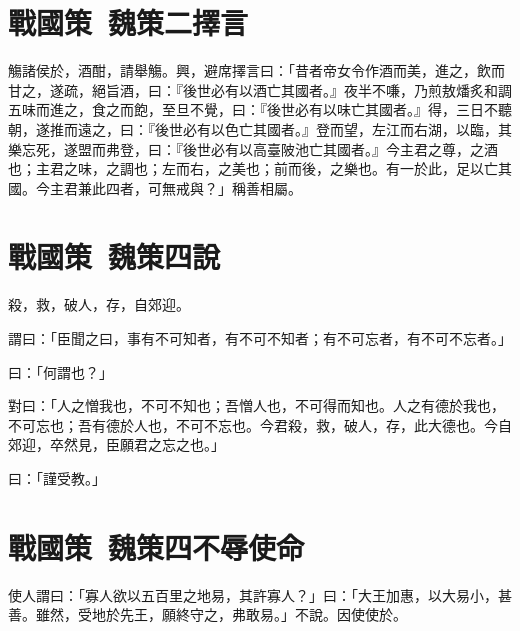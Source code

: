 \section[魯共公擇言\quad{\small 戰國策\ 魏策二}]{{\normalsize 戰國策\ 魏策二}\quad {}擇言}
觴諸侯於，酒酣，請舉觴。興，避席擇言曰：「昔者帝女令作酒而美，進之，飲而甘之，遂疏，絕旨酒，曰：『後世必有以酒亡其國者。』夜半不嗛，乃煎敖燔炙和調五味而進之，食之而飽，至旦不覺，曰：『後世必有以味亡其國者。』得，三日不聽朝，遂推而遠之，曰：『後世必有以色亡其國者。』登而望，左江而右湖，以臨，其樂忘死，遂盟而弗登，曰：『後世必有以高臺陂池亡其國者。』今主君之尊，之酒也；主君之味，之調也；左而右，之美也；前而後，之樂也。有一於此，足以亡其國。今主君兼此四者，可無戒與？」稱善相屬。

\section[唐雎說信陵君\quad{\small 戰國策\ 魏策四}]{{\normalsize 戰國策\ 魏策四}\quad {}說}
殺，救，破人，存，自郊迎。

謂曰：「臣聞之曰，事有不可知者，有不可不知者；有不可忘者，有不可不忘者。」

曰：「何謂也？」

對曰：「人之憎我也，不可不知也；吾憎人也，不可得而知也。人之有德於我也，不可忘也；吾有德於人也，不可不忘也。今君殺，救，破人，存，此大德也。今自郊迎，卒然見，臣願君之忘之也。」

曰：「謹受教。」

\theendnotes

\section[唐雎不辱使命\quad{\small 戰國策\ 魏策四}]{{\normalsize 戰國策\ 魏策四}\quad {}不辱使命}
使人謂曰：「寡人欲以五百里之地易，其許寡人？」曰：「大王加惠，以大易小，甚善。雖然，受地於先王，願終守之，弗敢易。」不說。因使使於。

